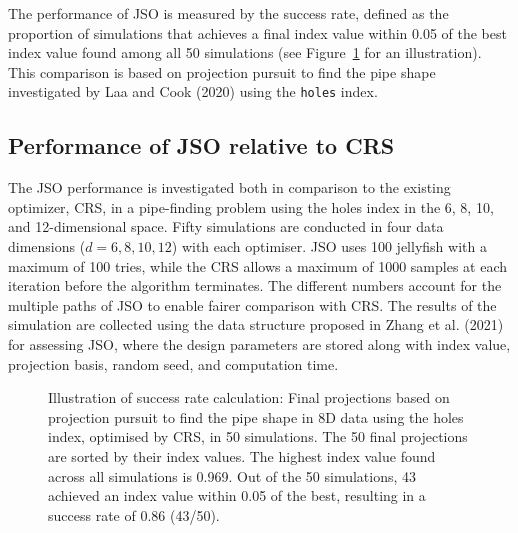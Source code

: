\documentclass[
  12pt,
]{interact}
\theoremstyle{plain}
\begin{document}
The performance of JSO is measured by the success rate, defined as the
proportion of simulations that achieves a final index value within 0.05
of the best index value found among all 50 simulations (see
Figure~\ref{fig-success-rate} for an illustration). This comparison is
based on projection pursuit to find the pipe shape investigated by Laa
and Cook (2020) using the \texttt{holes} index.

\subsection{Performance of JSO relative to CRS}\label{sec-app-1}

The JSO performance is investigated both in comparison to the existing
optimizer, CRS, in a pipe-finding problem using the holes index in the
6, 8, 10, and 12-dimensional space. Fifty simulations are conducted in
four data dimensions (\(d = 6, 8, 10, 12\)) with each optimiser. JSO
uses 100 jellyfish with a maximum of 100 tries, while the CRS allows a
maximum of 1000 samples at each iteration before the algorithm
terminates. The different numbers account for the multiple paths of JSO
to enable fairer comparison with CRS. The results of the simulation are
collected using the data structure proposed in Zhang et al. (2021) for
assessing JSO, where the design parameters are stored along with index
value, projection basis, random seed, and computation time.

\begin{figure}


\caption{\label{fig-success-rate}Illustration of success rate
calculation: Final projections based on projection pursuit to find the
pipe shape in 8D data using the holes index, optimised by CRS, in 50
simulations. The 50 final projections are sorted by their index values.
The highest index value found across all simulations is 0.969. Out of
the 50 simulations, 43 achieved an index value within 0.05 of the best,
resulting in a success rate of 0.86 (43/50).}

\end{figure}%
\end{document}
